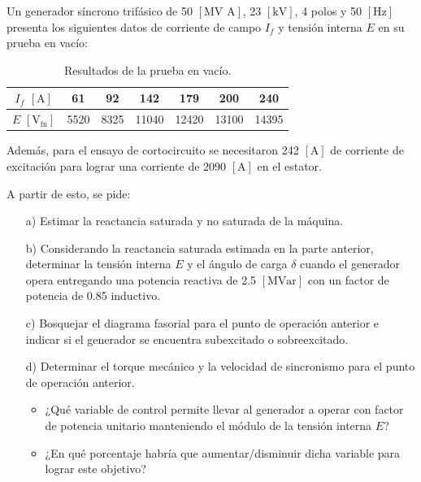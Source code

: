 \documentclass[
  11pt,
  letterpaper,
   addpoints,
   answers
  ]{exam}
\begin{document}
\begin{questions}
    \question Un generador síncrono trifásico de 50 $[\text{MV A}]$, 23 $[\text{kV}]$, 4 polos y 50 $[\text{Hz}]$ presenta los siguientes datos de corriente de campo $I_f$ y tensión interna $E$ en su prueba en vacío:
    \begin{table}[h!]
        \centering
        \begin{tabular}{|c|c|c|c|c|c|c|}
            \hline
            $I_f$ $[\text{A}]$ & 61 & 92 & 142 & 179 & 200 & 240 \\
            \hline
            $E$ $[\text{V}_{\text{fn}}]$ & 5520 & 8325 & 11040 & 12420 & 13100 & 14395 \\
            \hline
        \end{tabular}
        \caption{Resultados de la prueba en vacío.}
    \end{table}

    Además, para el ensayo de cortocircuito se necesitaron 242 $[\text{A}]$ de corriente de excitación para lograr una corriente de 2090 $[\text{A}]$ en el estator.
    
    A partir de esto, se pide:
    
    \begin{enumerate}
        \item[a)] Estimar la reactancia saturada y no saturada de la máquina.
        \item[b)] Considerando la reactancia saturada estimada en la parte anterior, determinar la tensión interna $E$ y el ángulo de carga $\delta$ cuando el generador opera entregando una potencia reactiva de 2.5 $[\text{MVar}]$ con un factor de potencia de 0.85 inductivo.
        \item[c)] Bosquejar el diagrama fasorial para el punto de operación anterior e indicar si el generador se encuentra subexcitado o sobreexcitado.
        \item[d)] Determinar el torque mecánico y la velocidad de sincronismo para el punto de operación anterior.
        \begin{itemize}
            \item ¿Qué variable de control permite llevar al generador a operar con factor de potencia unitario manteniendo el módulo de la tensión interna $E$?
            \item ¿En qué porcentaje habría que aumentar/disminuir dicha variable para lograr este objetivo?
        \end{itemize}
    \end{enumerate}
    

\end{questions}
\end{document}
